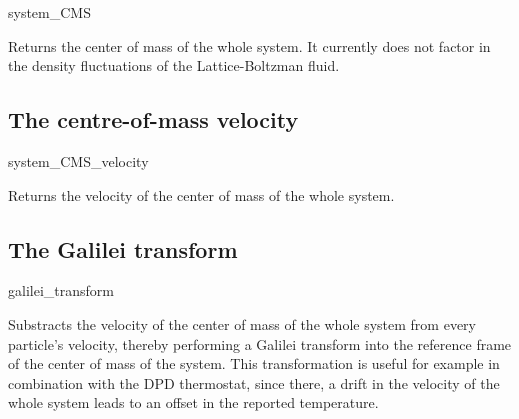 \begin{pysyntax}
\end{pysyntax}
\begin{essyntax}
  system_CMS
\end{essyntax}
Returns the center of mass of the whole system. It currently does not
factor in the density fluctuations of the Lattice-Boltzman fluid.

\subsection{The centre-of-mass velocity}

\begin{pysyntax}
\end{pysyntax}
\begin{essyntax}
  system_CMS_velocity
\end{essyntax}
Returns the velocity of the center of mass of the whole system.

\subsection{The Galilei transform}

\begin{pysyntax}
\end{pysyntax}
\begin{essyntax}
  galilei_transform
\end{essyntax}
Substracts the velocity of the center of mass of the whole system from
every particle's velocity, thereby performing a Galilei transform into
the reference frame of the center of mass of the system. This
transformation is useful for example in combination with the DPD
thermostat, since there, a drift in the velocity of the whole system
leads to an offset in the reported temperature.

